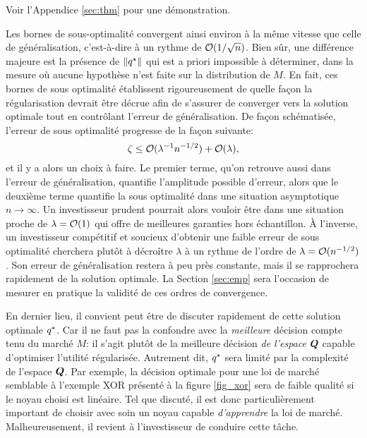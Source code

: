 Voir l'Appendice \ref{sec:thm} pour une démonstration. 


Les bornes de sous-optimalité convergent ainsi environ à la même vitesse que celle de
généralisation, c'est-à-dire à un rythme de $\mathcal O(1/\sqrt{n})$. Bien sûr, une différence
majeure est la présence de $\|q^\star\|$ qui est a priori impossible à déterminer, dans la
mesure où aucune hypothèse n'est faite sur la distribution de $M$.  En fait, ces bornes de
sous optimalité établissent rigoureusement de quelle façon la régularisation devrait être
décrue afin de s'assurer de converger vers la solution optimale tout en contrôlant
l'erreur de généralisation. De façon schématisée, l'erreur de sous optimalité progresse de
la façon suivante:
\begin{equation}
  \zeta \leq \mathcal O(\lambda^{-1}n^{-1/2}) + \mathcal O(\lambda),
\end{equation}
et il y a alors un choix à faire. Le premier terme, qu'on retrouve aussi dans l'erreur de
généralisation, quantifie l'amplitude possible d'erreur, alors que le deuxième terme
quantifie la sous optimalité dans une situation asymptotique $n \to \infty$. Un investisseur
prudent pourrait alors vouloir être dans une situation proche de $\lambda = \mathcal O(1)$ qui offre
de meilleures garanties hors échantillon. À l'inverse, un investisseur compétitif et
soucieux d'obtenir une faible erreur de sous optimalité cherchera plutôt à décroître
$\lambda$ à un rythme de l'ordre de $\lambda = \mathcal O(n^{-1/2})$. Son erreur de généralisation restera
à peu près constante, mais il se rapprochera rapidement de la solution optimale. La
Section \ref{sec:emp} sera l'occasion de mesurer en pratique la validité de ces ordres de
convergence.

En dernier lieu, il convient peut être de discuter rapidement de cette solution optimale
$q^\star$. Car il ne faut pas la confondre avec la \textit{meilleure} décision compte tenu du
marché $M$: il s'agit plutôt de la meilleure décision \textit{de l'espace} $\bm Q$ capable
d'optimiser l'utilité régularisée. Autrement dit, $q^\star$ sera limité par la complexité de
l'espace $\bm Q$. Par exemple, la décision optimale pour une loi de marché semblable à
l'exemple XOR présenté à la figure \ref{fig_xor} sera de faible qualité si le noyau choisi
est linéaire. Tel que discuté, il est donc particulièrement important de choisir avec soin
un noyau capable \textit{d'apprendre} la loi de marché. Malheureusement, il revient à
l'investisseur de conduire cette tâche.





